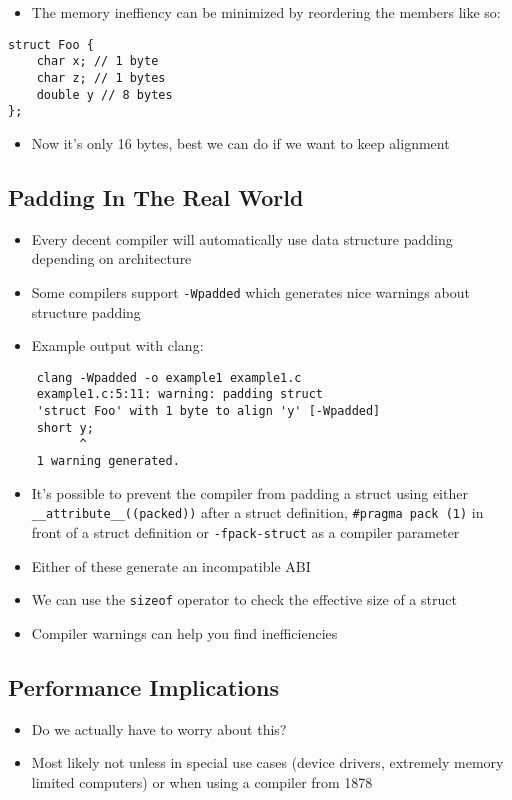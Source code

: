 \documentclass[a4paper,12pt]{scrartcl}
\begin{document}
\begin{itemize}
    \item The memory ineffiency can be minimized by reordering the members like so:
\end{itemize}
\begin{verbatim}
struct Foo {
    char x; // 1 byte
    char z; // 1 bytes
    double y // 8 bytes
};
\end{verbatim}
\begin{itemize}
    \item Now it's only 16 bytes, best we can do if we want to keep alignment
\end{itemize}

\subsection{Padding In The Real World}
\begin{itemize}
    \item Every decent compiler will automatically use data structure padding depending
        on architecture
    \item Some compilers support \verb|-Wpadded| which generates nice warnings about structure
        padding
    \item Example output with clang:
\end{itemize}
\begin{verbatim}
    clang -Wpadded -o example1 example1.c
    example1.c:5:11: warning: padding struct 
    'struct Foo' with 1 byte to align 'y' [-Wpadded]
    short y;
          ^
    1 warning generated.
\end{verbatim}

\begin{itemize}
    \item It's possible to prevent the compiler from padding a struct using either
        \verb|__attribute__((packed))| after a struct definition, \verb|#pragma pack (1)| in
        front of a struct definition or \verb|-fpack-struct| as a compiler parameter
    \item Either of these generate an incompatible ABI
    \item We can use the \verb|sizeof| operator to check the effective size of a struct
    \item Compiler warnings can help you find inefficiencies
\end{itemize}

\subsection{Performance Implications}
\begin{itemize}
    \item Do we actually have to worry about this?
    \item Most likely not unless in special use cases (device drivers, extremely memory
        limited computers) or when using a compiler from 1878
\end{itemize}
\end{document}
